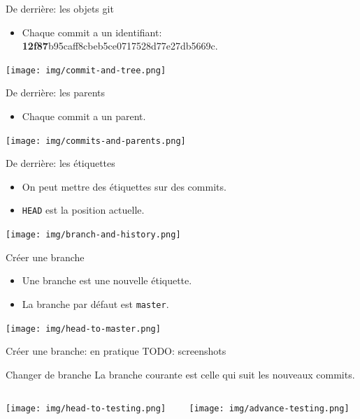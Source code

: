 \documentclass{beamer}
\begin{document}
\begin{frame}{De derrière: les objets git}
    \begin{itemize}
        \item Chaque commit a un identifiant: \textbf{12f87}b95caff8cbeb5ce0717528d77e27db5669c.
    \end{itemize}
    \begin{center}
    \texttt{[image: img/commit-and-tree.png]}
    \end{center}
\end{frame}

\begin{frame}{De derrière: les parents}
    \begin{itemize}
        \item Chaque commit a un parent.
    \end{itemize}
    \texttt{[image: img/commits-and-parents.png]}
\end{frame}

\begin{frame}{De derrière: les étiquettes}
    \begin{itemize}
        \item On peut mettre des étiquettes sur des commits.
        \item \texttt{HEAD} est la position actuelle.
    \end{itemize}
    \texttt{[image: img/branch-and-history.png]}
\end{frame}

\begin{frame}{Créer une branche}
    \begin{itemize}
        \item Une branche est une nouvelle étiquette.
        \item La branche par défaut est \texttt{master}.
    \end{itemize}
    \begin{center}
        \texttt{[image: img/head-to-master.png]}
    \end{center}
\end{frame}

\begin{frame}{Créer une branche: en pratique}
    TODO: screenshots
\end{frame}

\begin{frame}{Changer de branche}
    La branche courante est celle qui suit les nouveaux commits.
    \begin{columns}
        \begin{column}{0.44\textwidth}
            \begin{center}
                \texttt{[image: img/head-to-testing.png]}
            \end{center}
        \end{column}
        \begin{column}{0.54\textwidth}
            \texttt{[image: img/advance-testing.png]}
        \end{column}
    \end{columns}
\end{frame}
\end{document}
